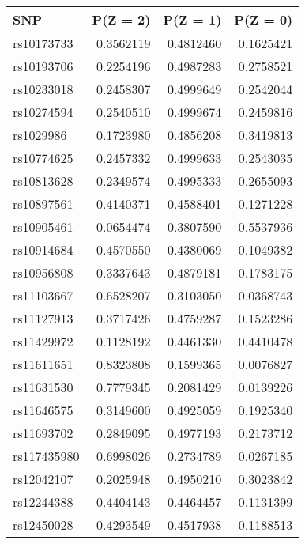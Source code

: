 \documentclass[
]{article}
\theoremstyle{plain}
\begin{document}
{\begin{table}[H]
  \caption{Table of the marginal distribution of instruments, $P(Z = z), z=0,1,2$, estimated after preprocessing for analysis in Section \ref{smoking-effect-on-lung-cancer}}
  \label{tab:marginal-distribution-of-instruments-lung-cancer}
  \begin{minipage}{0.5\linewidth}
    \center
    \begin{table}[H]
\centering
\begin{tabular}{lrrr}
\toprule
SNP & P(Z = 2) & P(Z = 1) & P(Z = 0)\\
\midrule
rs10173733 & 0.3562119 & 0.4812460 & 0.1625421\\
rs10193706 & 0.2254196 & 0.4987283 & 0.2758521\\
rs10233018 & 0.2458307 & 0.4999649 & 0.2542044\\
rs10274594 & 0.2540510 & 0.4999674 & 0.2459816\\
rs1029986 & 0.1723980 & 0.4856208 & 0.3419813\\
\addlinespace
rs10774625 & 0.2457332 & 0.4999633 & 0.2543035\\
rs10813628 & 0.2349574 & 0.4995333 & 0.2655093\\
rs10897561 & 0.4140371 & 0.4588401 & 0.1271228\\
rs10905461 & 0.0654474 & 0.3807590 & 0.5537936\\
rs10914684 & 0.4570550 & 0.4380069 & 0.1049382\\
\addlinespace
rs10956808 & 0.3337643 & 0.4879181 & 0.1783175\\
rs11103667 & 0.6528207 & 0.3103050 & 0.0368743\\
rs11127913 & 0.3717426 & 0.4759287 & 0.1523286\\
rs11429972 & 0.1128192 & 0.4461330 & 0.4410478\\
rs11611651 & 0.8323808 & 0.1599365 & 0.0076827\\
\addlinespace
rs11631530 & 0.7779345 & 0.2081429 & 0.0139226\\
rs11646575 & 0.3149600 & 0.4925059 & 0.1925340\\
rs11693702 & 0.2849095 & 0.4977193 & 0.2173712\\
rs117435980 & 0.6998026 & 0.2734789 & 0.0267185\\
rs12042107 & 0.2025948 & 0.4950210 & 0.3023842\\
\addlinespace
rs12244388 & 0.4404143 & 0.4464457 & 0.1131399\\
rs12450028 & 0.4293549 & 0.4517938 & 0.1188513\\

\end{tabular}
\end{table}
\end{minipage}
\end{table}}
\end{document}
